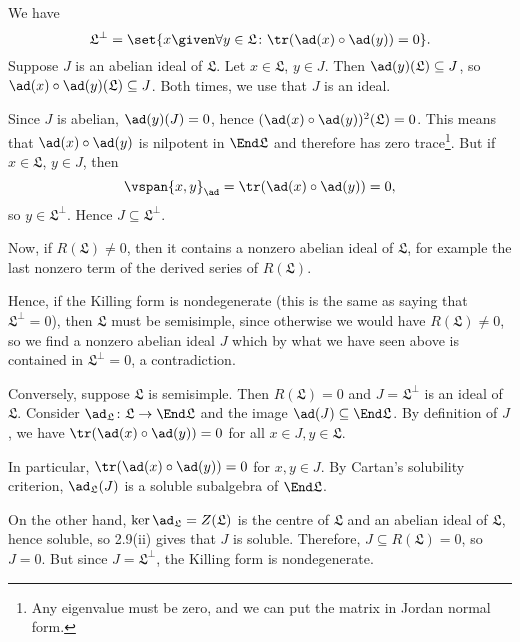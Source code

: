 We have
\[  \mathfrak{L}^\perp = \set{x\given\forall y \in \mathfrak{L}\colon \tr(\ad(x) \circ \ad(y)) = 0}. \]
Suppose $J$ is an abelian ideal of $\mathfrak{L}$. Let $x \in \mathfrak{L}$,
$y \in J$. Then $\ad(y)(\mathfrak{L}) \subseteq J$, so $\ad(x) \circ \ad(y)(\mathfrak{L}) \subseteq J$.
Both times, we use that $J$ is an ideal.

Since $J$ is abelian, $\ad(y)(J) = 0$, hence $(\ad(x) \circ \ad(y))^2(\mathfrak{L}) = 0$.
This means that $\ad(x) \circ \ad(y)$ is nilpotent in $\End \mathfrak{L}$ and therefore
has zero trace\footnote{Any eigenvalue must be zero, and we can put the matrix
in Jordan normal form.}. But if $x \in \mathfrak{L}$, $y \in J$, then
\[ \vspan{x, y}_{\ad} = \tr(\ad(x) \circ \ad(y)) = 0, \]
so $y \in \mathfrak{L}^{\perp}$. Hence $J \subseteq \mathfrak{L}^\perp$.

Now, if $R(\mathfrak{L})\neq 0$, then it contains a nonzero abelian ideal of $\mathfrak{L}$,
for example the last nonzero term of the derived series of $R(\mathfrak{L})$.

Hence, if the Killing form is nondegenerate (this is the same as saying that
$\mathfrak{L}^\perp = 0$), then $\mathfrak{L}$ must be semisimple, since otherwise
we would have $R(\mathfrak{L})\neq 0$, so we find a nonzero abelian ideal $J$ which
by what we have seen above is contained in $\mathfrak{L}^\perp = 0$, a contradiction.

Conversely, suppose $\mathfrak{L}$ is semisimple. Then $R(\mathfrak{L}) = 0$ and
$J = \mathfrak{L}^\perp$ is an ideal of $\mathfrak{L}$. Consider $\ad_{\mathfrak{L}}\colon \mathfrak{L} \to \End\mathfrak{L}$ and
the image $\ad(J) \subseteq \End \mathfrak{L}$. By definition of $J$, we have
$\tr(\ad(x)\circ \ad(y)) = 0$ for all $x \in J, y \in\mathfrak{L}$.

In particular, $\tr(\ad(x) \circ \ad(y)) = 0$ for $x, y \in J$.
By Cartan's solubility criterion, $\ad_{\mathfrak{L}}(J)$ is a soluble subalgebra
of $\End\mathfrak{L}$.

On the other hand, $\ker\ad_{\mathfrak{L}} = Z(\mathfrak{L})$ is the centre of
$\mathfrak{L}$ and an abelian ideal of $\mathfrak{L}$, hence soluble, so
2.9(ii) gives that $J$ is soluble. Therefore, $J \subseteq R(\mathfrak{L}) = 0$, so
$J = 0$. But since $J = \mathfrak{L}^\perp$, the Killing form is nondegenerate.
